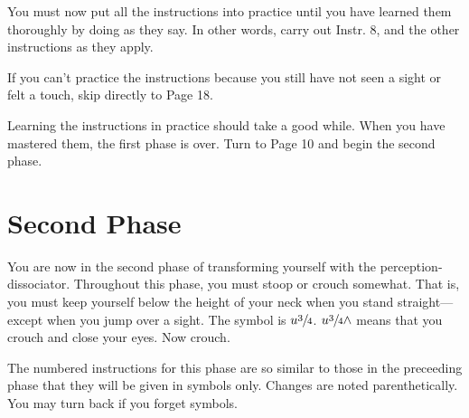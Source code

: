 You must now put all the instructions into practice until you have 
learned them thoroughly by doing as they say. In other words, carry out 
Instr. 8, and the other instructions as they apply. 

If you can't practice the instructions because you still have not seen a 
sight or felt a touch, skip directly to Page 18. 

Learning the instructions in practice should take a good while. When 
you have mastered them, the first phase is over. Turn to Page 10 and begin 
the second phase. 

\clearpage


\section{Second Phase}

You are now in the second phase of transforming yourself with the 
perception-dissociator. Throughout this phase, you must stoop or crouch 
somewhat. That is, you must keep yourself below the height of your neck 
when you stand straight---except when you jump over a sight. The symbol is 
$u\sfrac{3}{4}$. $u\sfrac{3}{4}\wedge$ means that you crouch and close your eyes. Now crouch. 

The numbered instructions for this phase are so similar to those in the 
preceeding phase that they will be given in symbols only. Changes are noted 
parenthetically. You may turn back if you forget symbols. 

